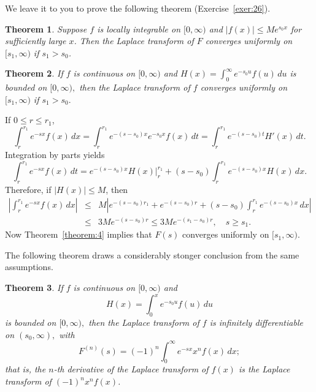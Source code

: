 \documentclass{article}
\newtheorem{theorem}{Theorem}
\newcommand{\proof}{\noindent{\sc\bf Proof}\quad }
\begin{document}
We leave it to you to prove the following theorem (Exercise~\ref{exer:26}).

\begin{theorem} \label{theorem:12}
Suppose $f$ is locally integrable on $[0,\infty)$  and
$|f(x)|\le M e^{s_{0}x}$  for sufficiently large $x$.
Then the Laplace
transform of $F$  converges uniformly on $[s_{1},\infty)$ if $s_{1}>s_{0}$.
\end{theorem}


\begin{theorem} \label{theorem:13}
If $f$ is continuous on $[0,\infty)$ and
$H(x)=\int_{0}^{\infty}e^{-s_{0}u}f(u)\,du$
is bounded on $[0,\infty),$  then the Laplace transform of $f$
converges uniformly on $[s_{1},\infty)$ if $s_{1}>s_{0}.$
\end{theorem}

\proof  If $0\le r\le r_{1}$,
$$
\int_{r}^{r_{1}}e^{-sx}f(x)\,dx
=\int_{r}^{r_{1}}e^{-(s-s_{0})x}e^{-s_{0}x}f(x)\,dt
=\int_{r}^{r_{1}}e^{-(s-s_{0})t}H'(x)\,dt.
$$
Integration by parts yields
$$
\int_{r}^{r_{1}}e^{-sx}f(x)\,dt=e^{-(s-s_{0})x}H(x)\biggr|_{r}^{r_{1}}
+(s-s_{0})\int_{r}^{r_{1}}e^{-(s-s_{0})x} H(x)\,dx.
$$
Therefore, if $|H(x)|\le M$, then
\begin{eqnarray*}
\left|\int_{r}^{r_{1}}e^{-sx}f(x)\,dx\right|&\le&
M\left|e^{-(s-s_{0})r_{1}}
+e^{-(s-s_{0})r} +(s-s_{0})\int_{r}^{r_{1}}e^{-(s-s_{0})x}\,dx\right|\\
&\le &3Me^{-(s-s_{0})r}\le 3Me^{-(s_{1}-s_{0})r},\quad s\ge s_{1}.
\end{eqnarray*}
Now Theorem~\ref{theorem:4} implies that $F(s)$ converges uniformly
on $[s_{1},\infty)$.

The following theorem draws a considerably stonger conclusion from
the same assumptions.

\begin{theorem}  \label{theorem:14}
If $f$  is continuous on $[0,\infty)$ and
$$
H(x)=\int_{0}^{x}e^{-s_{0}u}f(u)\,du
$$
is bounded on $[0,\infty),$  then the Laplace transform of $f$
is infinitely differentiable on $(s_{0},\infty),$ with
\begin{equation} \label{eq:30}
F^{(n)}(s)=(-1)^{n}\int_{0}^{\infty} e^{-sx} x^{n}f(x)\,dx;
\end{equation}
that is, the $n$-th derivative of the Laplace transform of $f(x)$ is the
Laplace transform of $(-1)^{n}x^{n}f(x)$.
\end{theorem}
\end{document}
